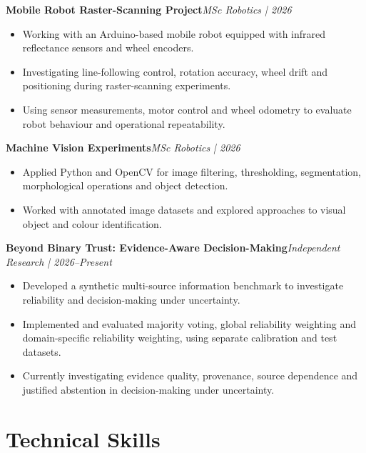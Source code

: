 \documentclass[10pt,a4paper]{article}
\newcommand{\project}[2]{
    \textbf{#1}\hfill\textit{#2}
    \par
}
\begin{document}
\project
    {Mobile Robot Raster-Scanning Project}
    {MSc Robotics | 2026}

\begin{itemize}
    \item Working with an Arduino-based mobile
    robot equipped with infrared reflectance
    sensors and wheel encoders.

    \item Investigating line-following control,
    rotation accuracy, wheel drift and
    positioning during raster-scanning
    experiments.

    \item Using sensor measurements, motor
    control and wheel odometry to evaluate
    robot behaviour and operational
    repeatability.
\end{itemize}

\project
    {Machine Vision Experiments}
    {MSc Robotics | 2026}

\begin{itemize}
    \item Applied Python and OpenCV for image
    filtering, thresholding, segmentation,
    morphological operations and object detection.

    \item Worked with annotated image datasets
    and explored approaches to visual object
    and colour identification.
\end{itemize}

\project
    {Beyond Binary Trust: Evidence-Aware
    Decision-Making}
    {Independent Research | 2026--Present}

\begin{itemize}
    \item Developed a synthetic multi-source
    information benchmark to investigate
    reliability and decision-making under
    uncertainty.

    \item Implemented and evaluated majority
    voting, global reliability weighting
    and domain-specific reliability weighting,
    using separate calibration and test datasets.

    \item Currently investigating evidence quality,
    provenance, source dependence and justified
    abstention in decision-making under uncertainty.
\end{itemize}

\section*{Technical Skills}
\end{document}
